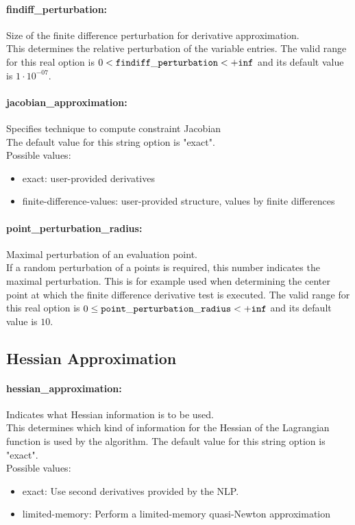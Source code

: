 \paragraph{findiff\_perturbation:}\label{opt:findiff_perturbation} Size of the finite difference perturbation for derivative approximation. \\
 This determines the relative perturbation of the variable entries. The valid range for this real option is 
$0 <  {\tt findiff\_perturbation } <  {\tt +inf}$
and its default value is $1 \cdot 10^{-07}$.


\paragraph{jacobian\_approximation:}\label{opt:jacobian_approximation} Specifies technique to compute constraint Jacobian \\
 The default value for this string option is "exact".
\\ 
Possible values:
\begin{itemize}
   \item exact: user-provided derivatives
   \item finite-difference-values: user-provided structure, values by finite differences
\end{itemize}

\paragraph{point\_perturbation\_radius:}\label{opt:point_perturbation_radius} Maximal perturbation of an evaluation point. \\
 If a random perturbation of a points is required, this number indicates the maximal perturbation.  This is for example used when determining the center point at which the finite difference derivative test is executed. The valid range for this real option is 
$0 \le {\tt point\_perturbation\_radius } <  {\tt +inf}$
and its default value is $10$.


\subsection{Hessian Approximation}
\label{sec:HessianApproximation}
\paragraph{hessian\_approximation:}\label{opt:hessian_approximation} Indicates what Hessian information is to be used. \\
 This determines which kind of information for the Hessian of the Lagrangian function is used by the algorithm. The default value for this string option is "exact".
\\ 
Possible values:
\begin{itemize}
   \item exact: Use second derivatives provided by the NLP.
   \item limited-memory: Perform a limited-memory quasi-Newton approximation
\end{itemize}

